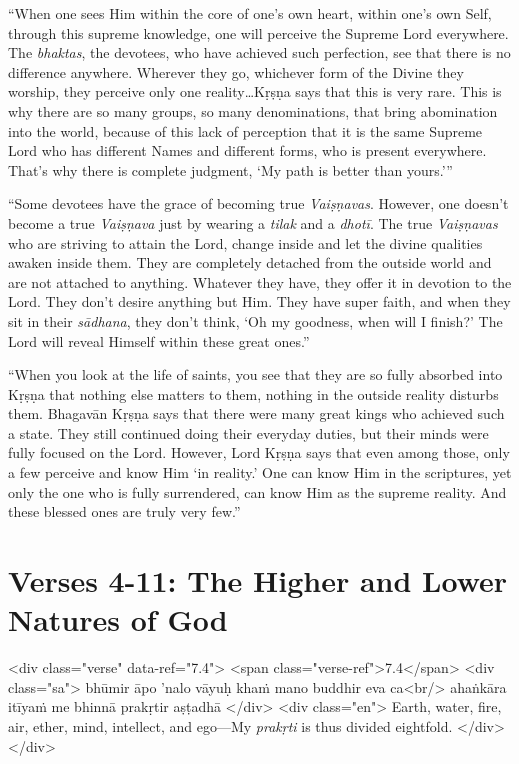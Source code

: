 \enquote{When one sees Him within the core of one’s own heart, within one’s own Self, through this supreme knowledge, one will perceive the Supreme Lord everywhere. The \textit{bhaktas}, the devotees, who have achieved such perfection, see that there is no difference anywhere. Wherever they go, whichever form of the Divine they worship, they perceive only one reality\ldots Kṛṣṇa says that this is very rare. This is why there are so many groups, so many denominations, that bring abomination into the world, because of this lack of perception that it is the same Supreme Lord who has different Names and different forms, who is present everywhere. That’s why there is complete judgment, \enquote{My path is better than yours.}}

\enquote{Some devotees have the grace of becoming true \textit{Vaiṣṇavas}. However, one doesn’t become a true \textit{Vaiṣṇava} just by wearing a \textit{tilak} and a \textit{dhotī}. The true \textit{Vaiṣṇavas} who are striving to attain the Lord, change inside and let the divine qualities awaken inside them. They are completely detached from the outside world and are not attached to anything. Whatever they have, they offer it in devotion to the Lord. They don’t desire anything but Him. They have super faith, and when they sit in their \textit{sādhana}, they don’t think, \enquote{Oh my goodness, when will I finish?} The Lord will reveal Himself within these great ones.}

\enquote{When you look at the life of saints, you see that they are so fully absorbed into Kṛṣṇa that nothing else matters to them, nothing in the outside reality disturbs them. Bhagavān Kṛṣṇa says that there were many great kings who achieved such a state. They still continued doing their everyday duties, but their minds were fully focused on the Lord. However, Lord Kṛṣṇa says that even among those, only a few perceive and know Him \enquote{in reality.} One can know Him in the scriptures, yet only the one who is fully surrendered, can know Him as the supreme reality. And these blessed ones are truly very few.}

\section{Verses 4-11: The Higher and Lower Natures of God}\label{sec-verses-4-11-the-higher-and-lower-natures-of-god}

\begin{html}
<div class="verse" data-ref="7.4">
  <span class="verse-ref">7.4</span>
  <div class="sa">
    bhūmir āpo ’nalo vāyuḥ khaṁ mano buddhir eva ca<br/>
    ahaṅkāra itīyaṁ me bhinnā prakṛtir aṣṭadhā
  </div>
  <div class="en">
    Earth, water, fire, air, ether, mind, intellect, and ego---My \textit{prakṛti} is thus divided eightfold.
  </div>
</div>
\end{html}



